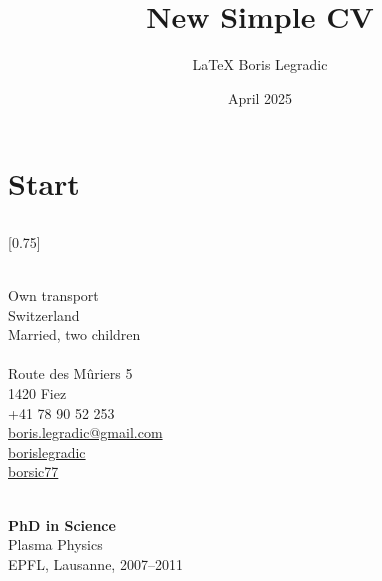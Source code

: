 \documentclass[verylight]{simplehipstercv}
\title{New Simple CV}
\author{\LaTeX{} Boris Legradic}
\date{April 2025}
\begin{document}
\thispagestyle{empty}

\section*{Start}

\subsection*{}
\vspace{4em}

\setlength{\columnsep}{1.5cm}
[0.75]
\begin{paracol}{2}
\paracolbackgroundoptions

\footnotesize
{\setasidefontcolour
\flushright

\bigskip \bigskip
\begin{center}
\end{center}
\bigskip \bigskip

\\[0.5em]
Own transport\\
Switzerland\\
Married, two children\\

\bigskip \bigskip
{}\\[0.5em]
Route des Mûriers 5\\
1420 Fiez\\
+41 78 90 52 253\\

\bigskip
\href{mailto:boris.legradic@gmail.com}{boris.legradic@gmail.com }\\
\href{https://www.linkedin.com/in/borislegradic}{borislegradic }\\
\href{https://github.com/borsic77}{borsic77 }

\bigskip \bigskip
{}\\[0.5em]

\textbf{PhD in Science}\\
Plasma Physics\\
EPFL, Lausanne, 2007–2011\\[0.5em]

}
\end{paracol}
\end{document}
